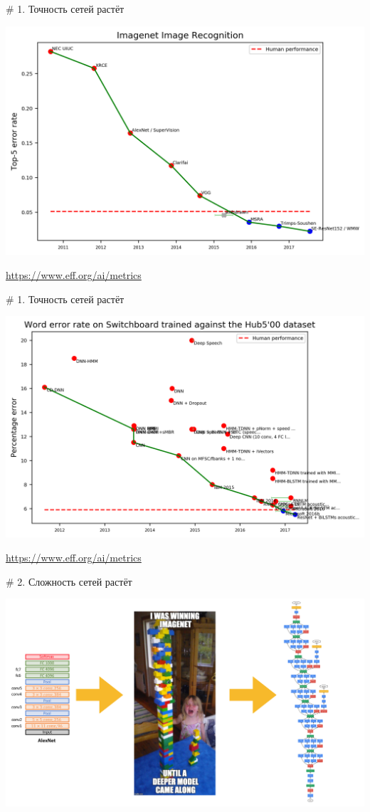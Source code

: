 \documentclass[notes,12pt, aspectratio=169]{beamer}
\begin{document}
\begin{frame}{\# 1. Точность сетей растёт}
\begin{center}
	\includegraphics[width=.7\linewidth]{imagenet_recognition.png}
\end{center}
\vfill %
\footnotesize
\color{blue} \url{https://www.eff.org/ai/metrics}
\end{frame} 


\begin{frame}{\# 1. Точность сетей растёт}
\begin{center}
	\includegraphics[width=.7\linewidth]{speech_recognition.png}
\end{center}
\vfill %
\footnotesize
\color{blue} \url{https://www.eff.org/ai/metrics}
\end{frame} 


\begin{frame}{\# 2. Сложность сетей растёт}
\begin{center}
	\includegraphics[width=.9\linewidth]{trend2.png}
\end{center}
\end{frame} 
\end{document}
